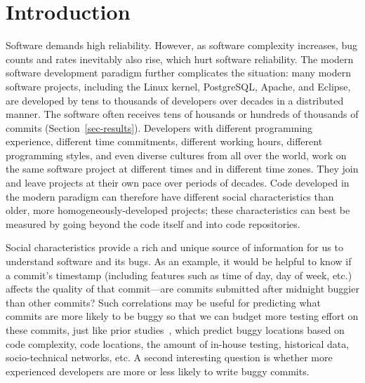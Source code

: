 \section{Introduction}

Software demands high reliability. However, as software complexity increases, 
bug counts and rates inevitably also rise, which hurt software reliability.
The modern software development paradigm further complicates the situation: 
many modern software projects, including the Linux kernel, PostgreSQL, 
Apache, and Eclipse, 
are developed by tens to thousands of developers over decades %
in a distributed manner. The software often receives tens of housands or hundreds of thousands 
of commits (Section~\ref{sec-results}). 
Developers with different programming experience, 
different time commitments, different working hours, different programming styles, and even diverse cultures from all over the world,
work on the same software project at different times and in different time zones. They join and leave projects 
at their own pace over periods of decades. 
Code developed in the modern paradigm can therefore have different 
social characteristics than older, more homogeneously-developed projects;
these characteristics can best be measured by going beyond the code itself and 
into code repositories.

Social characteristics provide a rich and unique source of information for us to 
understand software and its bugs. As an example, it would be helpful to know if  
a commit's timestamp (including features such as time of day, day of week, etc.) affects the quality of that commit---are commits submitted after midnight buggier than other commits? 
Such correlations may be useful for predicting what commits are more likely
to be buggy so that we can budget more testing effort on these commits, just like prior 
studies~\cite{graves00predicting, guo04robust, Hassan09, libre07, devNetwork08, predictionMenzies10, effort03, ostrand05predicting, 
depGraph08, zimmermann-promise-2007},
which predict buggy locations based on code complexity, 
code locations, the amount of in-house testing, historical data, socio-technical networks, etc. 
A second interesting question is whether more experienced developers are more or less
likely to write buggy commits. 




